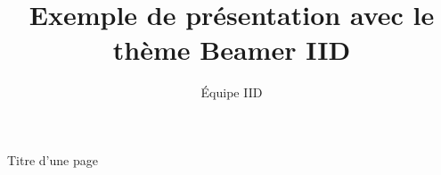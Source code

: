 \documentclass{beamer}
\title{Exemple de présentation avec le thème Beamer IID}
\author{Équipe IID}
\begin{document}
\begin{frame}[plain]
    \maketitle
\end{frame}
\begin{frame}{Titre d'une page}
\end{frame}
\end{document}
